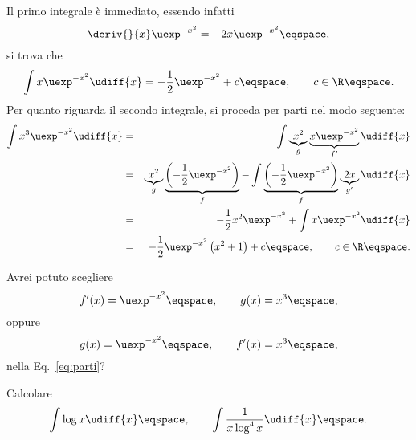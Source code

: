 \begin{Solution}
Il primo integrale \`e immediato, essendo infatti
\begin{displaymath}
\deriv{}{x} \uexp^{-x^{2}} = -2x \uexp^{-x^{2}} \eqspace, 
\end{displaymath}
si trova che
\begin{displaymath}
\int x \uexp^{-x^{2}} \udiff{x} = -\frac{1}{2} \uexp^{-x^{2}} + c \eqspace ,
\qquad c\in\R \eqspace .
\end{displaymath}
Per quanto riguarda il secondo integrale, si proceda per parti nel modo
seguente:
\begin{eqnarray}
\int x^{3} \uexp^{-x^{2}} \udiff{x} &=& \int \underbrace{x^{2}}_{g}
\underbrace{x \uexp^{-x^{2}}}_{f^{\prime}} \udiff{x} \label{eq:parti}\\
&=& \underbrace{x^{2}}_{g} \underbrace{ \left( - \frac{1}{2} \uexp^{ -x^{2}}
\right)}_{f} - \int \underbrace{\left( -\frac{1}{2} \uexp^{-x^{2}} \right)}_{f}
\underbrace{2x}_{g'} \udiff{x} \nonumber \\
&=& -\frac{1}{2} x^{2} \uexp^{-x^{2}}  + \int  x \uexp^{-x^{2}} \udiff{x}
\nonumber \\
&=& - \frac{1}{2} \uexp^{-x^{2}} \left( x^{2} +1 \right) + c \eqspace ,\qquad
c\in\R \eqspace .\nonumber 
\end{eqnarray}
\end{Solution}
\begin{homework}
Avrei potuto scegliere
\begin{displaymath}
f^{\prime}(x) = \uexp^{-x^{2}}  \eqspace, \qquad g(x) = x^{3} \eqspace, 
\end{displaymath}
oppure
\begin{displaymath}
g(x)  = \uexp^{-x^{2}}  \eqspace, \qquad f^{\prime}(x)= x^{3} \eqspace, 
\end{displaymath}
nella Eq.~\eqref{eq:parti}?
\end{homework}
\begin{Exercise}
Calcolare
\begin{displaymath}
\int \log x \udiff{x} \eqspace, \qquad 
\int \frac{1}{x\log^{4} x } \udiff{x} \eqspace .
\end{displaymath}
\end{Exercise}
